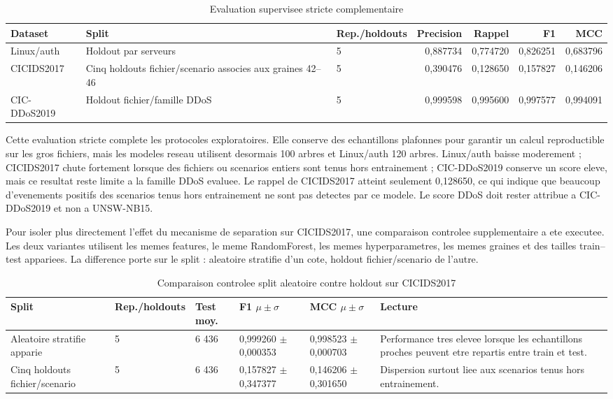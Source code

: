 \begin{table}[H]
\centering
\caption{Evaluation supervisee stricte complementaire}
\label{tab:supervised-strict-splits}
\scriptsize
\begin{tabularx}{\textwidth}{p{3.0cm}p{4.0cm}p{1.8cm}rrrr}
\toprule
\textbf{Dataset} & \textbf{Split} & \textbf{Rep./holdouts} & \textbf{Precision} & \textbf{Rappel} & \textbf{F1} & \textbf{MCC} \\
\midrule
Linux/auth & Holdout par serveurs & 5 & 0,887734 & 0,774720 & 0,826251 & 0,683796 \\
CICIDS2017 & Cinq holdouts fichier/scenario associes aux graines 42--46 & 5 & 0,390476 & 0,128650 & 0,157827 & 0,146206 \\
CIC-DDoS2019 & Holdout fichier/famille DDoS & 5 & 0,999598 & 0,995600 & 0,997577 & 0,994091 \\
\bottomrule
\end{tabularx}
\end{table}

Cette evaluation stricte complete les protocoles exploratoires. Elle conserve des echantillons plafonnes pour garantir un calcul reproductible sur les gros fichiers, mais les modeles reseau utilisent desormais 100 arbres et Linux/auth 120 arbres. Linux/auth baisse moderement ; CICIDS2017 chute fortement lorsque des fichiers ou scenarios entiers sont tenus hors entrainement ; CIC-DDoS2019 conserve un score eleve, mais ce resultat reste limite a la famille DDoS evaluee. Le rappel de CICIDS2017 atteint seulement 0,128650, ce qui indique que beaucoup d'evenements positifs des scenarios tenus hors entrainement ne sont pas detectes par ce modele. Le score DDoS doit rester attribue a CIC-DDoS2019 et non a UNSW-NB15.

Pour isoler plus directement l'effet du mecanisme de separation sur CICIDS2017, une comparaison controlee supplementaire a ete executee. Les deux variantes utilisent les memes features, le meme RandomForest, les memes hyperparametres, les memes graines et des tailles train--test appariees. La difference porte sur le split : aleatoire stratifie d'un cote, holdout fichier/scenario de l'autre.

\begin{table}[H]
\centering
\caption{Comparaison controlee split aleatoire contre holdout sur CICIDS2017}
\label{tab:controlled-split-cicids}
\scriptsize
\begin{tabularx}{\textwidth}{p{3.0cm}p{1.2cm}p{2.0cm}p{2.2cm}p{2.2cm}X}
\toprule
\textbf{Split} & \textbf{Rep./holdouts} & \textbf{Test moy.} & \textbf{F1 $\mu \pm \sigma$} & \textbf{MCC $\mu \pm \sigma$} & \textbf{Lecture} \\
\midrule
Aleatoire stratifie apparie & 5 & 6 436 & 0,999260 $\pm$ 0,000353 & 0,998523 $\pm$ 0,000703 & Performance tres elevee lorsque les echantillons proches peuvent etre repartis entre train et test. \\
Cinq holdouts fichier/scenario & 5 & 6 436 & 0,157827 $\pm$ 0,347377 & 0,146206 $\pm$ 0,301650 & Dispersion surtout liee aux scenarios tenus hors entrainement. \\
\bottomrule
\end{tabularx}
\end{table}


